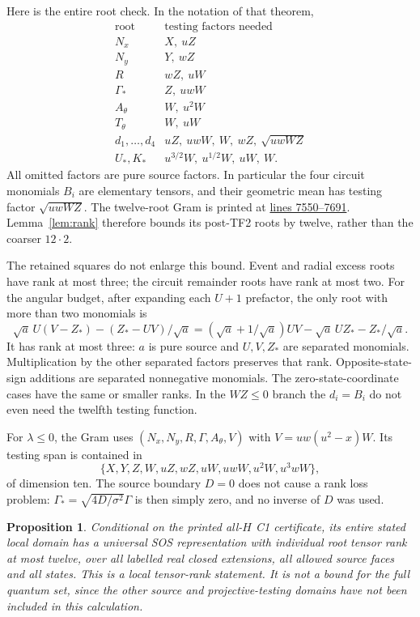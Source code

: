 \documentclass[11pt]{article}
\newtheorem{proposition}{Proposition}
\begin{document}
Here is the entire root check. In the notation of that theorem,
\[
\begin{array}{c|l}
\text{root}&\text{testing factors needed}\\\hline
N_x&X,\ uZ\\
N_y&Y,\ wZ\\
R&wZ,\ uW\\
\Gamma_*&Z,\ uwW\\
A_\theta&W,\ u^2W\\
T_\theta&W,\ uW\\
d_1,\ldots,d_4&uZ,\ uwW,\ W,\ wZ,\ \sqrt{uwWZ}\\
U_*,K_*&u^{3/2}W,\ u^{1/2}W,\ uW,\ W.
\end{array}
\]
All omitted factors are pure source factors. In particular the
four circuit monomials $B_i$ are elementary tensors, and their
geometric mean has testing factor $\sqrt{uwWZ}$.
The twelve-root Gram is printed at
\href{https://github.com/anubhav70747/q222-finite-sdp/blob/0c1ce2e15ed067a6845464e2468559cea5274f2c/latex/certificates/c1_short.tex#L7550-L7691}
{lines 7550--7691}. Lemma~\ref{lem:rank} therefore bounds its
post-TF2 roots by twelve, rather than the coarser $12\cdot2$.

The retained squares do not enlarge this bound. Event and radial
excess roots have rank at most three; the circuit remainder roots
have rank at most two. For the angular budget, after expanding
each $U+1$ prefactor, the only root with more than two monomials is
\[
 \sqrt a\,U(V-Z_*)-(Z_*-UV)/\sqrt a
 =(\sqrt a+1/\sqrt a)UV-\sqrt a\,UZ_*-Z_*/\sqrt a.
\]
It has rank at most three: $a$ is pure source and $U,V,Z_*$ are
separated monomials. Multiplication by the other separated factors
preserves that rank. Opposite-state-sign additions are separated
nonnegative monomials. The zero-state-coordinate cases have the
same or smaller ranks. In the $WZ\le0$ branch the $d_i=B_i$ do
not even need the twelfth testing function.

For $\lambda\le0$, the Gram uses
$(N_x,N_y,R,\Gamma,A_\theta,V)$ with
$V=uw(u^2-x)W$. Its testing span is contained in
\[
 \{X,Y,Z,W,uZ,wZ,uW,uwW,u^2W,u^3wW\},
\]
of dimension ten. The source boundary $D=0$ does not cause a
rank loss problem: $\Gamma_*=\sqrt{4D/\sigma^2}\Gamma$ is then
simply zero, and no inverse of $D$ was used.

\begin{proposition}\label{prop:local12}
Conditional on the printed all-$H$ C1 certificate, its entire
stated local domain has a universal SOS representation with
individual root tensor rank at most twelve, over all labelled
real closed extensions, all allowed source faces and all states.
This is a local tensor-rank statement. It is not a bound for the
full quantum set, since the other source and projective-testing
domains have not been included in this calculation.
\end{proposition}
\end{document}
